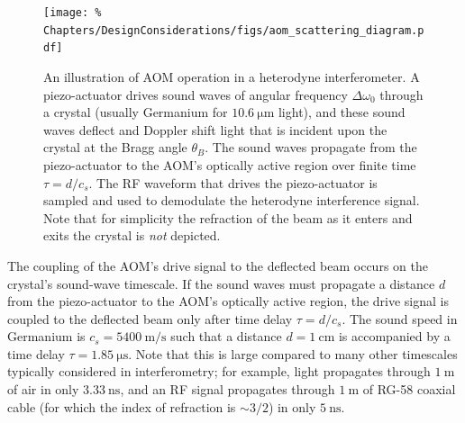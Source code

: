 \begin{figure}
  \centering
  \texttt{[image: \%
    Chapters/DesignConsiderations/figs/aom\_scattering\_diagram.pdf]}
  \caption[Illustration of AOM operation in a heterodyne interferometer]{%
    An illustration of AOM operation in a heterodyne interferometer.
    A piezo-actuator drives sound waves of angular frequency $\Delta \omega_0$
    through a crystal (usually Germanium for $\SI{10.6}{\micro\meter}$ light),
    and these sound waves deflect and Doppler shift light
    that is incident upon the crystal at the Bragg angle $\theta_B$.
    The sound waves propagate from the piezo-actuator
    to the AOM's optically active region
    over finite time $\tau = d / c_s$.
    The RF waveform that drives the piezo-actuator
    is sampled and used to demodulate the heterodyne interference signal.
    Note that for simplicity the refraction of the beam
    as it enters and exits the crystal is \emph{not} depicted.}
\label{fig:DesignConsiderations:aom_scattering_diagram}
\end{figure}

The coupling of the AOM's drive signal to the deflected beam
occurs on the crystal's sound-wave timescale.
If the sound waves must propagate a distance $d$
from the piezo-actuator to the AOM's optically active region,
the drive signal is coupled to the deflected beam
only after time delay $\tau = d / c_s$.
The sound speed in Germanium is $c_s = \SI{5400}{\meter\per\second}$
such that a distance $d = \SI{1}{\centi\meter}$
is accompanied by a time delay $\tau = \SI{1.85}{\micro\second}$.
Note that this is large compared to many other timescales
typically considered in interferometry;
for example, light propagates
through $\SI{1}{\meter}$ of air
in only $\SI{3.33}{\nano\second}$,
and an RF signal propagates
through $\SI{1}{\meter}$ of RG-58 coaxial cable
(for which the index of refraction is $\sim 3 / 2$)
in only $\SI{5}{\nano\second}$.


